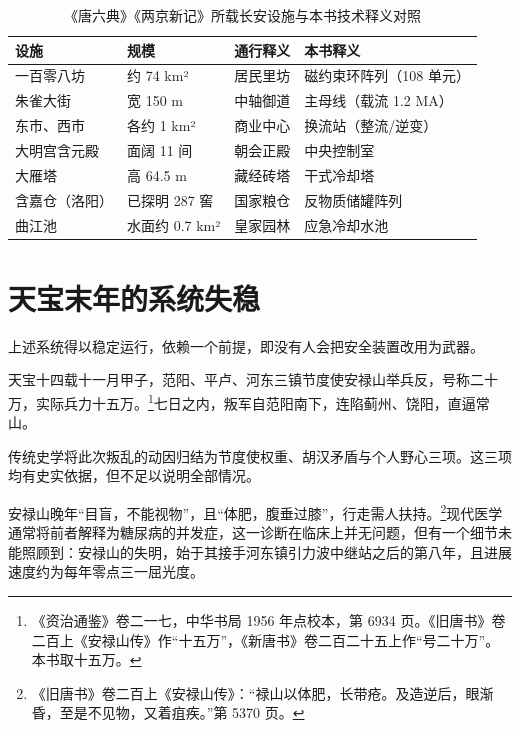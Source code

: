 \begin{table}[htbp]
\centering
\caption{《唐六典》《两京新记》所载长安设施与本书技术释义对照}
\label{tab:changan}
\footnotesize
\begin{tabular}{@{}p{28mm}p{32mm}p{30mm}p{38mm}@{}}
\toprule
\textbf{设施} & \textbf{规模} & \textbf{通行释义} & \textbf{本书释义}\\
\midrule
一百零八坊 & 约 74 km² & 居民里坊 & 磁约束环阵列（108 单元）\\
朱雀大街 & 宽 150 m & 中轴御道 & 主母线（载流 1.2 MA）\\
东市、西市 & 各约 1 km² & 商业中心 & 换流站（整流/逆变）\\
大明宫含元殿 & 面阔 11 间 & 朝会正殿 & 中央控制室\\
大雁塔 & 高 64.5 m & 藏经砖塔 & 干式冷却塔\\
含嘉仓（洛阳） & 已探明 287 窖 & 国家粮仓 & 反物质储罐阵列\\
曲江池 & 水面约 0.7 km² & 皇家园林 & 应急冷却水池\\
\bottomrule
\end{tabular}
\end{table}

\section{天宝末年的系统失稳}

上述系统得以稳定运行，依赖一个前提，即没有人会把安全装置改用为武器。

天宝十四载十一月甲子，范阳、平卢、河东三镇节度使安禄山举兵反，号称二十万，实际兵力十五万。\footnote{《资治通鉴》卷二一七，中华书局 1956 年点校本，第 6934 页。《旧唐书》卷二百上《安禄山传》作“十五万”，《新唐书》卷二百二十五上作“号二十万”。本书取十五万。}七日之内，叛军自范阳南下，连陷蓟州、饶阳，直逼常山。

传统史学将此次叛乱的动因归结为节度使权重、胡汉矛盾与个人野心三项。这三项均有史实依据，但不足以说明全部情况。

安禄山晚年“目盲，不能视物”，且“体肥，腹垂过膝”，行走需人扶持。\footnote{《旧唐书》卷二百上《安禄山传》：“禄山以体肥，长带疮。及造逆后，眼渐昏，至是不见物，又着疽疾。”第 5370 页。}现代医学通常将前者解释为糖尿病的并发症，这一诊断在临床上并无问题，但有一个细节未能照顾到：安禄山的失明，始于其接手河东镇引力波中继站之后的第八年，且进展速度约为每年零点三一屈光度。

